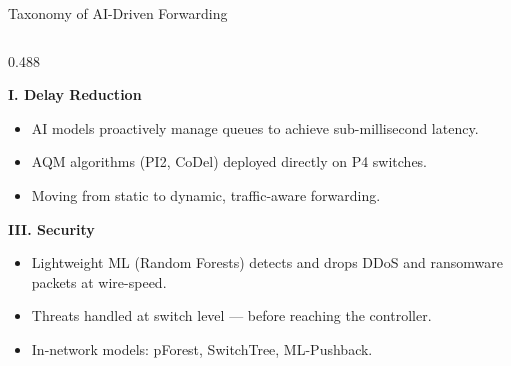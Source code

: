 {
\begin{frame}{Taxonomy of AI-Driven Forwarding}


  \begin{columns}[T, totalwidth=\textwidth]

    \begin{column}{0.488\textwidth}

      \begin{tcolorbox}[problemcard=HUAblue]
        {\color{HUAblue}\bfseries\small
          I. Delay Reduction}
        \vspace{4pt}
        \begin{itemize}
          \setlength\itemsep{2pt}
          \footnotesize
          \item AI models proactively manage queues
                to achieve sub-millisecond latency.
          \item AQM algorithms (PI2, CoDel) deployed
                directly on P4 switches.
          \item Moving from static to dynamic,
                traffic-aware forwarding.
        \end{itemize}
      \end{tcolorbox}

      \vspace{8pt}

      \begin{tcolorbox}[problemcard=problemred]
        {\color{problemred}\bfseries\small
          III. Security}
        \vspace{4pt}
        \begin{itemize}
          \setlength\itemsep{2pt}
          \footnotesize
          \item Lightweight ML (Random Forests)
                detects and drops DDoS and
                ransomware packets at wire-speed.
          \item Threats handled at switch level ---
                before reaching the controller.
          \item In-network models: pForest,
                SwitchTree, ML-Pushback.
        \end{itemize}
      \end{tcolorbox}

    \end{column}


\end{columns}
\end{frame}}
